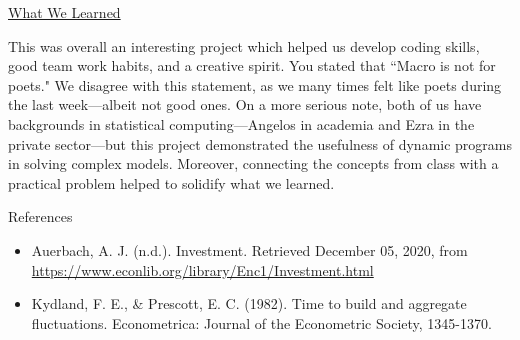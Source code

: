 \documentclass[12pt]{article}
\begin{document}
\begin{doublespace}
\begin{center}
\normalsize\underline{What We Learned}
\end{center}

This was overall an interesting project which helped us develop coding skills, good team work habits, and a creative spirit. You stated that ``Macro is not for poets." We disagree with this statement, as we many times felt like poets during the last week---albeit not good ones. On a more serious note, both of us have backgrounds in statistical computing---Angelos in academia and Ezra in the private sector---but this project demonstrated the usefulness of dynamic programs in solving complex models. Moreover, connecting the concepts from class with a practical problem helped to solidify what we learned. 

\newpage
\begin{center}
\LARGE{References}
\end{center}

\begin{itemize}
\item Auerbach, A. J. (n.d.). Investment. Retrieved December 05, 2020, from \url{https://www.econlib.org/library/Enc1/Investment.html}
\item Kydland, F. E., \& Prescott, E. C. (1982). Time to build and aggregate fluctuations. Econometrica: Journal of the Econometric Society, 1345-1370.
\end{itemize}




\end{doublespace}
\end{document}
